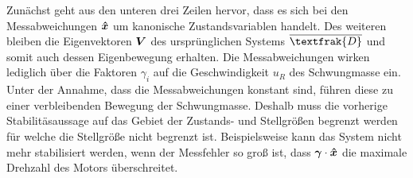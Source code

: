 Zunächst geht aus den unteren drei Zeilen hervor, dass es sich bei den Messabweichungen $\boldsymbol{\hat{x}}$ um kanonische Zustandsvariablen handelt. Des weiteren bleiben die Eigenvektoren $\boldsymbol{V}$ des ursprünglichen Systems $\overline{\textfrak{D}}$ und somit auch dessen Eigenbewegung erhalten. Die Messabweichungen wirken lediglich über die Faktoren $\gamma_i$ auf die Geschwindigkeit $u_R$ des Schwungmasse ein. Unter der Annahme, dass die Messabweichungen konstant sind, führen diese zu einer verbleibenden Bewegung der Schwungmasse. Deshalb muss die vorherige Stabilitäsaussage auf das Gebiet der Zustands- und Stellgrößen begrenzt werden für welche die Stellgröße nicht begrenzt ist. Beispielsweise kann das System nicht mehr stabilisiert werden, wenn der Messfehler so groß ist, dass $\boldsymbol{\gamma}\cdot \boldsymbol{\hat{x}}$ die maximale Drehzahl des Motors überschreitet.

